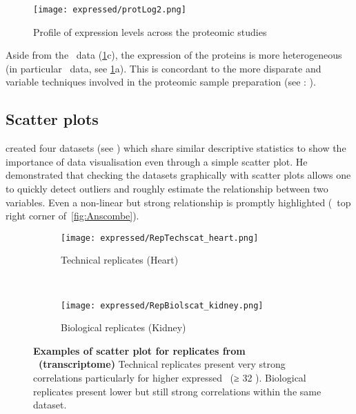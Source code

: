 \begin{figure}[!htbp]
\texttt{[image: expressed/protLog2.png]}
\caption{Profile of expression levels across the proteomic studies
    }\label{fig:distribProt}
\end{figure}

Aside from the \pandey\ data (\cref{fig:distribProt}c),
the expression of the proteins is more heterogeneous
(in particular \cutler\ data, see \cref{fig:distribProt}a).
This is concordant to the more disparate and variable techniques involved in
the proteomic sample preparation (see :
).

\subsection{Scatter plots}

\citet{anscombe} created four datasets (see )
which share similar descriptive statistics to show the importance
of data visualisation even through a simple scatter plot.
He demonstrated that checking the datasets graphically with scatter plots
allows one to quickly detect outliers and roughly estimate
the relationship between two variables.
Even a non-linear but strong relationship is promptly highlighted
(\eg\ top right corner of~\cref{fig:Anscombe}).

\begin{figure}[!htbp]
    \hspace*{-2cm}
    \begin{subfigure}[b]{0.61\textwidth}
      \centering  \texttt{[image: expressed/RepTechscat\_heart.png]}
        \caption{Technical replicates (Heart)}\label{fig:scatTechRep}
    \end{subfigure}~%
    \begin{subfigure}[b]{0.61\textwidth}
    \centering \texttt{[image: expressed/RepBiolscat\_kidney.png]}
        \caption{Biological replicates (Kidney)}\label{fig:scatBiolRep}
    \end{subfigure}
    \caption[Examples of scatter plot for replicates from \uhlen\ (transcriptome)
    ]{\textbf{Examples of scatter plot for replicates from \uhlen\ (transcriptome)}
     Technical replicates present very strong correlations particularly for
    higher expressed \mRNAs\ (≥ 32 \FPKM).
    Biological replicates present lower but still strong correlations within
    the same dataset.
    }\label{fig:scatEg}
\end{figure}

